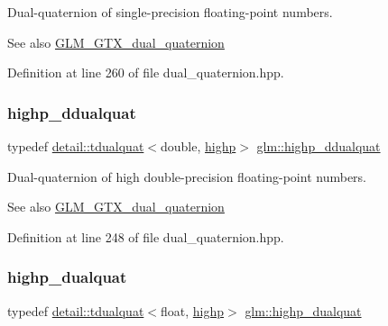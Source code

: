 Dual-\/quaternion of single-\/precision floating-\/point numbers.

\begin{DoxySeeAlso}{See also}
\hyperlink{group__gtc__dual__quaternion}{G\+L\+M\+\_\+\+G\+T\+X\+\_\+dual\+\_\+quaternion} 
\end{DoxySeeAlso}


Definition at line 260 of file dual\+\_\+quaternion.\+hpp.

\mbox{\label{group__gtc__dual__quaternion_ga61b654c21f080135aedcf23461eb1037}} 
\subsubsection{\texorpdfstring{highp\+\_\+ddualquat}{highp\_ddualquat}}
{\footnotesize\ttfamily typedef \hyperlink{structglm_1_1detail_1_1tdualquat}{detail\+::tdualquat}$<$double, \hyperlink{namespaceglm_a0f04f086094c747d227af4425893f545ac6f7eab42eacbb10d59a58e95e362074}{highp}$>$ \hyperlink{group__gtc__dual__quaternion_ga61b654c21f080135aedcf23461eb1037}{glm\+::highp\+\_\+ddualquat}}

Dual-\/quaternion of high double-\/precision floating-\/point numbers.

\begin{DoxySeeAlso}{See also}
\hyperlink{group__gtc__dual__quaternion}{G\+L\+M\+\_\+\+G\+T\+X\+\_\+dual\+\_\+quaternion} 
\end{DoxySeeAlso}


Definition at line 248 of file dual\+\_\+quaternion.\+hpp.

\mbox{\label{group__gtc__dual__quaternion_gaf3a01deb502f53ca555ee1d45e6d6776}} 
\subsubsection{\texorpdfstring{highp\+\_\+dualquat}{highp\_dualquat}}
{\footnotesize\ttfamily typedef \hyperlink{structglm_1_1detail_1_1tdualquat}{detail\+::tdualquat}$<$float, \hyperlink{namespaceglm_a0f04f086094c747d227af4425893f545ac6f7eab42eacbb10d59a58e95e362074}{highp}$>$ \hyperlink{group__gtc__dual__quaternion_gaf3a01deb502f53ca555ee1d45e6d6776}{glm\+::highp\+\_\+dualquat}}

